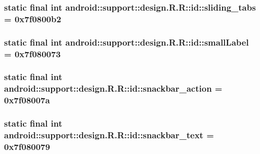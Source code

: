 \hypertarget{classandroid_1_1support_1_1design_1_1_r_1_1id_175b640c3347858bfed43384554599a9}{
\subsubsection[{sliding\_\-tabs}]{\setlength{\rightskip}{0pt plus 5cm}static final int android::support::design.R.R::id::sliding\_\-tabs = 0x7f0800b2}}
\label{classandroid_1_1support_1_1design_1_1_r_1_1id_175b640c3347858bfed43384554599a9}


\hypertarget{classandroid_1_1support_1_1design_1_1_r_1_1id_5147924140d772aae36fc1ee6129f186}{
\subsubsection[{smallLabel}]{\setlength{\rightskip}{0pt plus 5cm}static final int android::support::design.R.R::id::smallLabel = 0x7f080073}}
\label{classandroid_1_1support_1_1design_1_1_r_1_1id_5147924140d772aae36fc1ee6129f186}


\hypertarget{classandroid_1_1support_1_1design_1_1_r_1_1id_d7dd7216924af144ea3ec07d4b205974}{
\subsubsection[{snackbar\_\-action}]{\setlength{\rightskip}{0pt plus 5cm}static final int android::support::design.R.R::id::snackbar\_\-action = 0x7f08007a}}
\label{classandroid_1_1support_1_1design_1_1_r_1_1id_d7dd7216924af144ea3ec07d4b205974}


\hypertarget{classandroid_1_1support_1_1design_1_1_r_1_1id_a9451e2c0b8f5414318926fa203970f2}{
\subsubsection[{snackbar\_\-text}]{\setlength{\rightskip}{0pt plus 5cm}static final int android::support::design.R.R::id::snackbar\_\-text = 0x7f080079}}
\label{classandroid_1_1support_1_1design_1_1_r_1_1id_a9451e2c0b8f5414318926fa203970f2}


